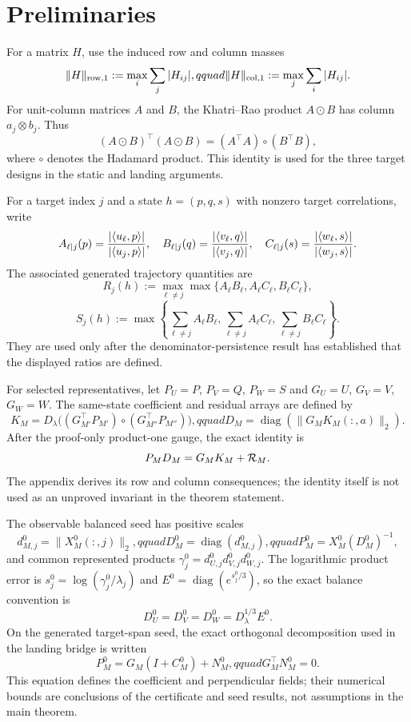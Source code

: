 \section{Preliminaries}\label{sec:preliminaries}

For a matrix $H$, use the induced row and column masses
\[
 \|H\|_{\rm row,1}:=\max_i\sum_j|H_{ij}|,qquad
 \|H\|_{\rm col,1}:=\max_j\sum_i|H_{ij}|.
\]
For unit-column matrices $A$ and $B$, the Khatri--Rao product $A\odot B$
has column $a_j\otimes b_j$. Thus
\[
 (A\odot B)^\top(A\odot B)=(A^\top A)\circ(B^\top B),
\]
where $\circ$ denotes the Hadamard product. This identity is used for the
three target designs in the static and landing arguments.

For a target index $j$ and a state $h=(p,q,s)$ with nonzero target
correlations, write
\[
 A_{\ell\mid j}(p)={|\langle u_\ell,p\rangle|\over
 |\langle u_j,p\rangle|},\quad
 B_{\ell\mid j}(q)={|\langle v_\ell,q\rangle|\over
 |\langle v_j,q\rangle|},\quad
 C_{\ell\mid j}(s)={|\langle w_\ell,s\rangle|\over
 |\langle w_j,s\rangle|}.
\]
The associated generated trajectory quantities are
\[
 R_j(h):=\max_{\ell\ne j}\max\{A_\ell B_\ell,A_\ell C_\ell,B_\ell C_\ell\},
\]
\[
 S_j(h):=\max\left\{\sum_{\ell\ne j}A_\ell B_\ell,
 \sum_{\ell\ne j}A_\ell C_\ell,
 \sum_{\ell\ne j}B_\ell C_\ell\right\}.
\]
They are used only after the denominator-persistence result has established
that the displayed ratios are defined.

For selected representatives, let $P_U=P$, $P_V=Q$, $P_W=S$ and
$G_U=U$, $G_V=V$, $G_W=W$. The same-state coefficient and residual arrays
are defined by
\[
 K_M=D_\lambda\bigl((G_{M'}^\top P_{M'})\circ
 (G_{M''}^\top P_{M''})\bigr),qquad
 D_M=\operatorname{diag}(\|G_MK_M(:,a)\|_2).
\]
After the proof-only product-one gauge, the exact identity is
\[
 P_MD_M=G_MK_M+{\cal R}_M.
\]
The appendix derives its row and column consequences; the identity itself is
not used as an unproved invariant in the theorem statement.

The observable balanced seed has positive scales
\[
 d_{M,j}^0=\|X_M^0(:,j)\|_2,qquad
 D_M^0=\operatorname{diag}(d_{M,j}^0),qquad
 P_M^0=X_M^0(D_M^0)^{-1},
\]
and common represented products
$\gamma_j^0=d_{U,j}^0d_{V,j}^0d_{W,j}^0$.  The logarithmic product error is
$s_j^0=\log(\gamma_j^0/\lambda_j)$ and
$E^0=\operatorname{diag}(e^{s_j^0/3})$, so the exact balance convention is
\[
 D_U^0=D_V^0=D_W^0=D_\lambda^{1/3}E^0.
\]
On the generated target-span seed, the exact orthogonal decomposition used
in the landing bridge is written
\[
 P_M^0=G_M(I+C_M^0)+N_M^0,qquad G_M^\top N_M^0=0.
\]
This equation defines the coefficient and perpendicular fields; their
numerical bounds are conclusions of the certificate and seed results, not
assumptions in the main theorem.

